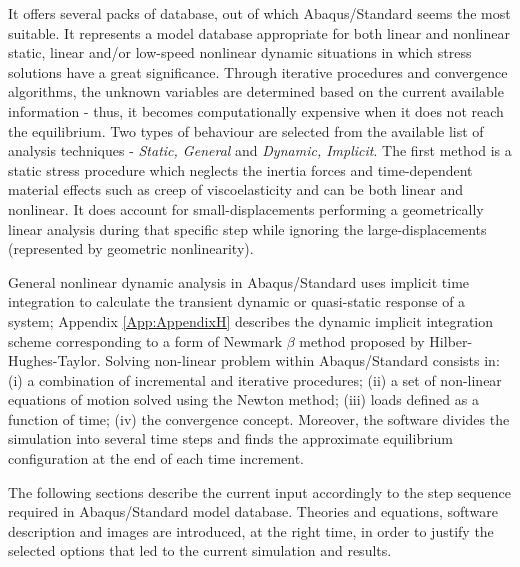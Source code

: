 \documentclass[12pt,a4paper]{report}
\begin{document}
It offers several packs of database, out of which Abaqus/Standard seems the most suitable. It represents a model database appropriate for both linear and nonlinear static, linear and/or low-speed nonlinear dynamic situations in which stress solutions have a great significance. Through iterative procedures and convergence algorithms, the unknown variables are determined based on the current available information - thus, it becomes computationally expensive when it does not reach the equilibrium. Two types of behaviour are selected from the available list of analysis techniques - \textit{Static, General} and \textit{Dynamic, Implicit}. The first method is a static stress procedure which neglects the inertia forces and time-dependent material effects such as creep of viscoelasticity and can be both linear and nonlinear. It does account for small-displacements performing a geometrically linear analysis during that specific step while ignoring the large-displacements (represented by geometric nonlinearity).

General nonlinear dynamic analysis in Abaqus/Standard uses implicit time integration to calculate the transient dynamic or quasi-static response of a system; Appendix \ref{App:AppendixH} describes the dynamic implicit integration scheme corresponding to a form of Newmark $\beta$ method proposed by Hilber-Hughes-Taylor. Solving non-linear problem within Abaqus/Standard consists in: (i) a combination of incremental and iterative procedures; (ii) a set of non-linear equations of motion solved using the Newton method; (iii) loads defined as a function of time; (iv) the convergence concept. Moreover, the software divides the simulation into several time steps and finds the approximate equilibrium configuration at the end of each time increment.

The following sections describe the current input accordingly to the step sequence required in Abaqus/Standard model database. Theories and equations, software description and images are introduced, at the right time, in order to justify the selected options that led to the current simulation and results.
\end{document}
